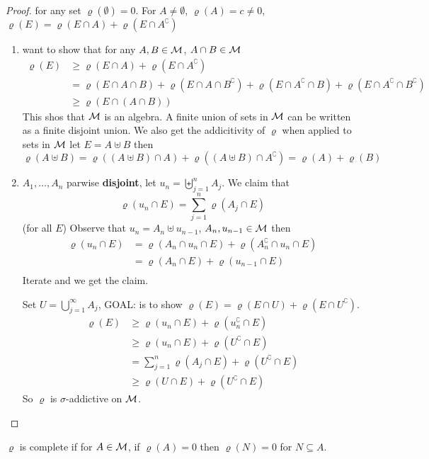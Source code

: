 \begin{proof}
  for any set $\varrho(\emptyset) = 0$. For $A \neq \emptyset$, $\varrho(A) = c \neq 0$,
  $\varrho(E) = \varrho(E \cap A) + \varrho(E\cap A^\complement)$
  \begin{enumerate}
    \item want to show that for any $A, B \in \mathcal M$, $A \cap B \in \mathcal M$
      \begin{align*}
        \varrho(E) &\ge \varrho(E \cap A) + \varrho(E \cap A^\complement) \\
        &= \varrho(E\cap A\cap B) + \varrho(E \cap A \cap B^\complement) + 
          \varrho(E \cap A^\complement \cap B) + \varrho(E \cap A^\complement \cap B^\complement) \\
        &\ge \varrho(E \cap (A \cap B)) 
      \end{align*}
      This shos that $\mathcal M$ is an algebra.
      A finite union of sets in $\mathcal M$ can be written as a finite disjoint union.
      We also get the addicitivity of $\varrho$ when applied to sets in $\mathcal M$
      let $E = A \uplus B$ then 
      \[\varrho(A \uplus B) = \varrho((A \uplus B) \cap A) + \varrho((A \uplus B) \cap A^\complement) = \varrho(A) + \varrho(B)\]
    \item $A_1, \dotsc, A_n$ parwise \textbf{disjoint}, let $u_n = \biguplus_{j=1}^n A_j$. 
      We claim that $$\varrho(u_n \cap E) = \sum_{j=1}^n \varrho(A_j \cap E)$$ (for all $E$)
      Observe that $u_n = A_n \uplus u_{n-1}$, $A_n, u_{n-1} \in \mathcal M$ then
      \begin{align*}
        \varrho(u_n \cap E) &= \varrho(A_n \cap u_n \cap E) + \varrho(A_n^\complement \cap u_n \cap E) \\
        &= \varrho(A_n \cap E) + \varrho(u_{n-1} \cap E) \\
      \end{align*}
      Iterate and we get the claim.

      Set $U = \bigcup_{j=1}^\infty A_j$, GOAL: is to show $\varrho(E) = \varrho(E \cap U) + \varrho(E \cap U^\complement)$.
      \begin{align*}
        \varrho(E) &\ge \varrho(u_n \cap E) + \varrho(u_n^\complement \cap E) \\
        &\ge \varrho(u_n \cap E) + \varrho(U^\complement \cap E) \\
        &= \sum_{j=1}^n\varrho(A_j \cap E) + \varrho(U^\complement \cap E) \\
        &\ge \varrho(U \cap E) + \varrho(U^\complement \cap E)
      \end{align*}
      So $\varrho$ is $\sigma$-addictive on $\mathcal M$.
  \end{enumerate} 
\end{proof}

\begin{definition}
  $\varrho$ is complete if for $A \in \mathcal M$, if $\varrho(A) = 0$ then $\varrho(N) = 0$ for $N \subseteq A$.
\end{definition}



